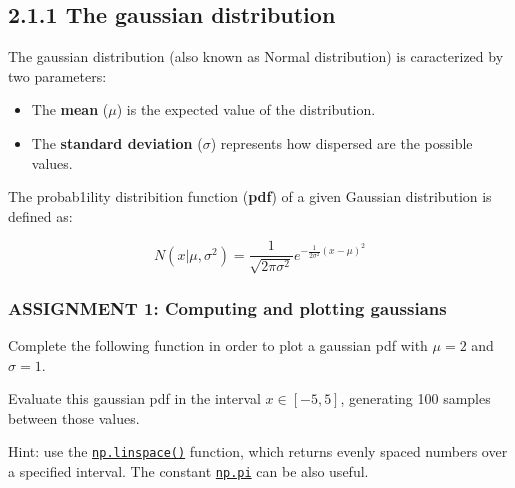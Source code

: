 \documentclass[11pt]{article}
\providecommand{\tightlist}{%
      \setlength{\itemsep}{0pt}\setlength{\parskip}{0pt}}
\begin{document}
    \hypertarget{the-gaussian-distribution}{%
\subsection{2.1.1 The gaussian
distribution}\label{the-gaussian-distribution}}

The gaussian distribution (also known as Normal distribution) is
caracterized by two parameters:

\begin{itemize}
\tightlist
\item
  The \textbf{mean} (\(\mu\)) is the expected value of the distribution.
\item
  The \textbf{standard deviation} (\(\sigma\)) represents how dispersed
  are the possible values.
\end{itemize}

The probab1ility distribition function (\textbf{pdf}) of a given
Gaussian distribution is defined as:

\[
    N(x | \mu, \sigma^2) = 
        \frac{1}{\sqrt{2\pi\sigma^2}}
            e^{-\frac{1}{2\sigma^2}\left(x - \mu \right)^2}
\]

\hypertarget{assignment-1-computing-and-plotting-gaussians}{%
\subsubsection{\texorpdfstring{\textbf{{ASSIGNMENT 1: Computing and
plotting
gaussians}}}{ASSIGNMENT 1: Computing and plotting gaussians}}\label{assignment-1-computing-and-plotting-gaussians}}

Complete the following function in order to plot a gaussian pdf with
\(\mu = 2\) and \(\sigma = 1\).

Evaluate this gaussian pdf in the interval \(x \in [-5, 5]\), generating
100 samples between those values.

Hint: use the
\href{https://numpy.org/doc/stable/reference/generated/numpy.linspace.html}{\texttt{np.linspace()}}
function, which returns evenly spaced numbers over a specified interval.
The constant
\href{https://numpy.org/doc/stable/reference/constants.html}{\texttt{np.pi}}
can be also useful.
\end{document}
